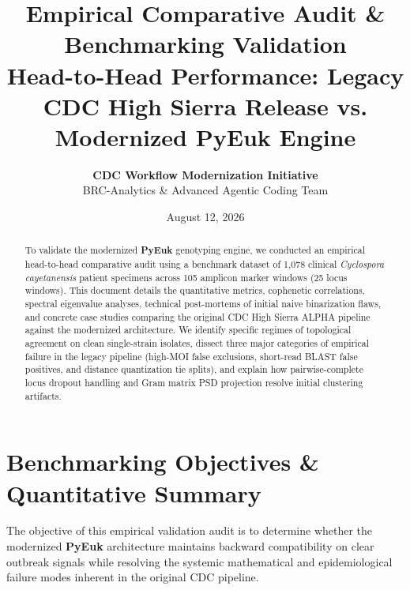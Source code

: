 \documentclass[11pt,a4paper]{article}
\title{\vspace{-1.5cm}\Huge \textbf{\color{CDCBlue} Empirical Comparative Audit \& Benchmarking Validation}\\[0.4em]
\Large \textbf{\color{SlateBlue} Head-to-Head Performance: Legacy CDC High Sierra Release vs. Modernized PyEuk Engine}}
\author{\textbf{CDC Workflow Modernization Initiative} \\ BRC-Analytics \& Advanced Agentic Coding Team}
\date{August 12, 2026}
\begin{document}
\maketitle

\begin{abstract}
\noindent To validate the modernized \textbf{PyEuk} genotyping engine, we conducted an empirical head-to-head comparative audit using a benchmark dataset of 1,078 clinical \textit{Cyclospora cayetanensis} patient specimens across 105 amplicon marker windows (25 locus windows). This document details the quantitative metrics, cophenetic correlations, spectral eigenvalue analyses, technical post-mortems of initial naive binarization flaws, and concrete case studies comparing the original CDC High Sierra ALPHA pipeline against the modernized architecture. We identify specific regimes of topological agreement on clean single-strain isolates, dissect three major categories of empirical failure in the legacy pipeline (high-MOI false exclusions, short-read BLAST false positives, and distance quantization tie splits), and explain how pairwise-complete locus dropout handling and Gram matrix PSD projection resolve initial clustering artifacts.
\end{abstract}

\section{Benchmarking Objectives \& Quantitative Summary}

The objective of this empirical validation audit is to determine whether the modernized \textbf{PyEuk} architecture maintains backward compatibility on clear outbreak signals while resolving the systemic mathematical and epidemiological failure modes inherent in the original CDC pipeline.
\end{document}
